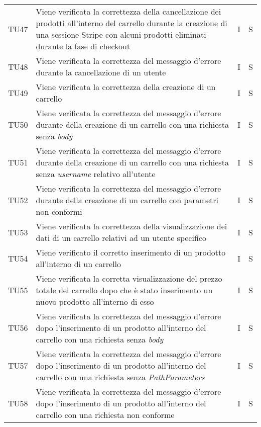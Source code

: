 {\begin{longtable}{C{2cm} C{9.6cm} C{1.5cm} C{1cm}}
TU47 & Viene verificata la correttezza della cancellazione dei prodotti all'interno del carrello durante la creazione di una sessione Stripe con alcuni prodotti eliminati durante la fase di checkout & I & S\\

TU48 & Viene verificata la correttezza del messaggio d'errore durante la cancellazione di un utente & I & S\\

TU49 & Viene verificata la correttezza della creazione di un carrello & I & S\\

TU50 & Viene verificata la correttezza del messaggio d'errore durante della creazione di un carrello con una richiesta senza \textit{body} & I & S\\

TU51 & Viene verificata la correttezza del messaggio d'errore durante della creazione di un carrello con una richiesta senza \textit{username} relativo all'utente & I & S\\

TU52 & Viene verificata la correttezza del messaggio d'errore durante della creazione di un carrello con parametri non conformi & I & S\\

TU53 & Viene verificata la correttezza della visualizzazione dei dati di un carrello relativi ad un utente specifico & I & S\\

TU54 & Viene verificato il corretto inserimento di un prodotto all'interno di un carrello & I & S\\

TU55 & Viene verificata la corretta visualizzazione del prezzo totale del carrello dopo che è stato inserimento un nuovo prodotto all'interno di esso & I & S\\

TU56 & Viene verificata la correttezza del messaggio d'errore dopo l'inserimento di un prodotto all'interno del carrello con una richiesta senza \textit{body} & I & S\\

TU57 & Viene verificata la correttezza del messaggio d'errore dopo l'inserimento di un prodotto all'interno del carrello con una richiesta senza \textit{PathParameters} & I & S\\

TU58 & Viene verificata la correttezza del messaggio d'errore dopo l'inserimento di un prodotto all'interno del carrello con una richiesta non conforme & I & S\\


\end{longtable}}
